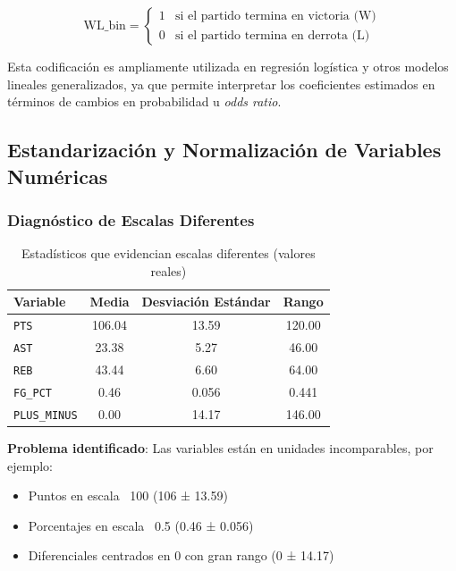 \documentclass[12pt]{article}
\begin{document}
\[
\text{WL\_bin} =
\begin{cases}
1 & \text{si el partido termina en victoria (W)} \\
0 & \text{si el partido termina en derrota (L)}
\end{cases}
\]

Esta codificación es ampliamente utilizada en regresión logística y otros modelos lineales
generalizados, ya que permite interpretar los coeficientes estimados en términos de cambios en
probabilidad u \textit{odds ratio}.

\subsection{Estandarización y Normalización de Variables Numéricas}
\label{subsec:estandarizacion}

\subsubsection{Diagnóstico de Escalas Diferentes}

\begin{table}[H]
\centering
\begin{tabular}{|l|c|c|c|}
\hline
\textbf{Variable} & \textbf{Media} & \textbf{Desviación Estándar} & \textbf{Rango} \\
\hline
\texttt{PTS} & 106.04 & 13.59 & 120.00 \\
\texttt{AST} & 23.38 & 5.27 & 46.00 \\
\texttt{REB} & 43.44 & 6.60 & 64.00 \\
\texttt{FG\_PCT} & 0.46 & 0.056 & 0.441 \\
\texttt{PLUS\_MINUS} & 0.00 & 14.17 & 146.00 \\
\hline
\end{tabular}
\caption{Estadísticos que evidencian escalas diferentes (valores reales)}
\label{tab:escalas-variables-reales}
\end{table}

\textbf{Problema identificado}: Las variables están en unidades incomparables, por ejemplo:

\begin{itemize}
    \item Puntos en escala ~100 (106 ± 13.59)
    \item Porcentajes en escala ~0.5 (0.46 ± 0.056)
    \item Diferenciales centrados en 0 con gran rango (0 ± 14.17)
\end{itemize}
\end{document}
